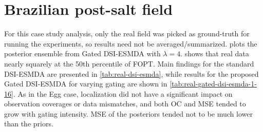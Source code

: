 \section{Brazilian post-salt field}
\label{sec:results-real-field}

For this case study analysis, only the real field was picked as ground-truth 
for running the experiments,
so results need not be averaged/summarized.
%
 plots the posterior ensemble from Gated DSI-ESMDA with $\lambda=4$.
%
 shows that real data
nearly squarely at the 50th percentile of FOPT.
%
Main findings for the standard DSI-ESMDA are presented in \cref{tab:real-dsi-esmda},
while results for the proposed Gated DSI-ESMDA for varying gating are shown in 
\cref{tab:real-gated-dsi-esmda-1-16}.
%
As in the Egg case,
localization did not have a significant impact on observation coverages or data mismatches,
and both OC and MSE tended to grow with gating intensity.
%
MSE of the posteriors tended not to be much lower than the priors.

\noindent
\begin{minipage}{0.4\linewidth}
    \centering
    \label{fig:fopt-real} 
    
\end{minipage}
%
\begin{minipage}{0.6\linewidth}
    \centering
    \label{tab:real-dsi-esmda}
    \ABNTEXfontereduzida
    
\end{minipage}

\begin{table}[htbp]
    \centering
\end{table}
